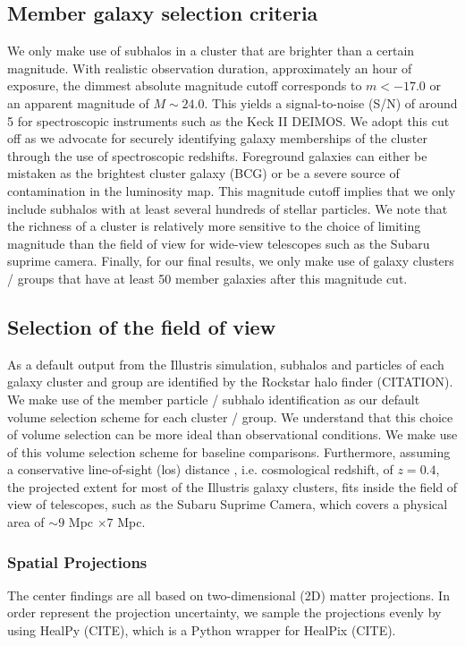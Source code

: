 \documentclass[usenatbib]{mn2e}
\begin{document}
\subsection{Member galaxy selection criteria}
We only make use of subhalos in a cluster that 
are brighter than a certain magnitude. 
With realistic observation duration, approximately an hour of exposure, 
the dimmest absolute magnitude cutoff corresponds to $m < -17.0$ or an apparent
magnitude of $M \sim 24.0$. This yields a signal-to-noise (S/N) of around 5 for spectroscopic
instruments such as the Keck II DEIMOS. 
We adopt this cut off as we advocate for 
securely identifying galaxy memberships of the cluster through the use of spectroscopic redshifts.
Foreground galaxies can either be mistaken as the brightest cluster galaxy (BCG) 
or be a severe source of contamination in the luminosity map.
This magnitude cutoff implies that we only include subhalos with 
at least several hundreds of stellar particles. 
We note that the richness of a cluster is relatively more sensitive to the choice of
limiting magnitude than the field of view for wide-view telescopes such as the
Subaru suprime camera.
Finally, for our final results, we only make use of galaxy clusters / groups that have at least 50 member galaxies after this magnitude cut. 




\subsection{Selection of the field of view}
As a default output from the Illustris simulation, subhalos and particles of
each galaxy cluster and group are identified by the Rockstar halo finder
(CITATION). We make use of the member particle / subhalo identification as our
default volume selection scheme for each cluster / group.
We understand that this choice of volume selection can be more ideal than
observational conditions. We make use of this volume selection scheme
for baseline comparisons. 
Furthermore, assuming a conservative line-of-sight (los) distance 
, i.e. cosmological redshift, of $z = 0.4$, 
the projected extent for most of the Illustris galaxy clusters, 
fits inside the field of view of telescopes, such as the Subaru Suprime Camera,
which covers a physical area of $\sim 9$ Mpc $\times 7$ Mpc. 

\subsubsection{Spatial Projections}
The center findings are all based on two-dimensional (2D) matter projections.
In order represent the projection uncertainty, we sample the projections evenly
by using HealPy (CITE), which is a Python wrapper for HealPix (CITE).
\end{document}
